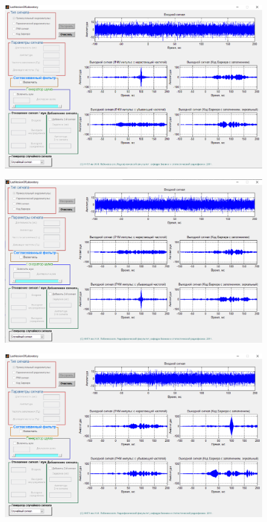 \begin{figure}[H]
    \centering
    \includegraphics[width=\linewidth]{imgs/task6/lfm}
    \caption{}
    \label{fig:6.1}
\end{figure}

\begin{figure}[H]
    \centering
    \includegraphics[width=\linewidth]{imgs/task6/lfm_mirror}
    \caption{}
    \label{fig:6.2}
\end{figure}

\begin{figure}[H]
    \centering
    \includegraphics[width=\linewidth]{imgs/task6/barker}
    \caption{}
    \label{fig:6.3}
\end{figure}

